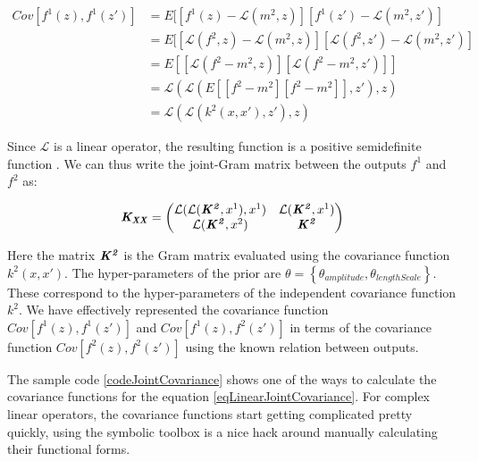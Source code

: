 \begin{equation}\label{eqCovF1F1}
\begin{aligned}
Cov[f^1(z), f^1(z')]   & = E[[f^{1}(z) - \mathcal{L}(m^2, z)][f^{1}(z') - \mathcal{L}(m^2, z')] \\
            & = E[[\mathcal{L}\left ( f^{2}, z \right ) - \mathcal{L}(m^2, z)][\mathcal{L}\left ( f^{2}, z' \right ) - \mathcal{L}(m^2, z')] \\ 
            & = E[[\mathcal{L}\left ( f^{2} - m^2 , z \right )][\mathcal{L}\left ( f^{2} - m^2, z' \right )]] \\
            & = \mathcal{L}\left(\mathcal{L}\left(E[[f^{2} - m^2][f^{2} - m^2]], z'\right) , z\right) \\
            & = \mathcal{L}\left(\mathcal{L}\left(k^2(x, x'), z'\right) , z\right)
\end{aligned}
\end{equation}

Since $\mathcal{L}$ is a linear operator, the resulting function is a positive semidefinite function \cite{ginsbourger2013invariances, sarkka2011linear}. We can thus write the joint-Gram matrix between the outputs $f^1$ and $f^2$ as:

\begin{equation}\label{eqLinearJointCovariance}
    \bm{\mathit{K_{XX}}} = \begin{pmatrix}
    \mathcal{L}(\mathcal{L}(\bm{\mathit{K^2}}, x^{1}), x^{1}) & \mathcal{L}(\bm{\mathit{K^2}}, x^{1})\\ \mathcal{L}(\bm{\mathit{K^2}}, x^{2}) & \bm{\mathit{K^2}}
    \end{pmatrix} 
\end{equation}

Here the matrix $\bm{\mathit{K^2}}$ is the Gram matrix evaluated using the covariance function $k^2(x, x')$. The hyper-parameters of the prior are \(\theta = \left \{ \theta_{amplitude}, \theta_{lengthScale} \right \}\). These correspond to the hyper-parameters of the independent covariance function \(k^{2}\). We have effectively represented the covariance function \(Cov[f^1(z), f^1(z')]\) and \(Cov[f^1(z), f^2(z')]\) in terms of the covariance function $Cov[f^2(z), f^2(z')]$ using the known relation between outputs. 

The sample code \ref{codeJointCovariance} shows one of the ways to calculate the covariance functions for the equation \ref{eqLinearJointCovariance}. For complex linear operators, the covariance functions start getting complicated pretty quickly, using the symbolic toolbox is a nice hack around manually calculating their functional forms. 

